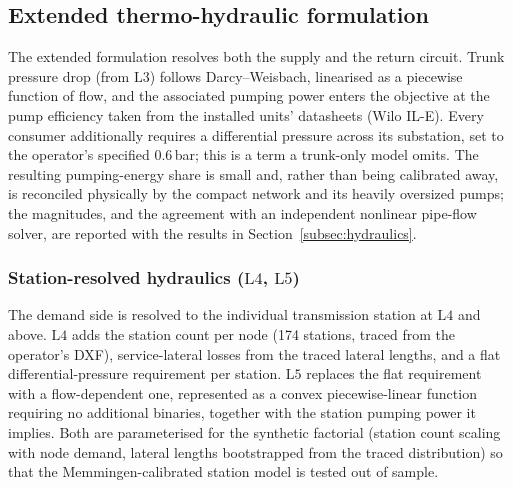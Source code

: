 \documentclass[a4paper,fleqn]{cas-sc}
\newcommand{\Lthree}{\ensuremath{\mathrm{L3}}}  %
\newcommand{\Lfour}{\ensuremath{\mathrm{L4}}}   %
\newcommand{\Lfive}{\ensuremath{\mathrm{L5}}}   %
\newcommand{\new}[1]{\textcolor[HTML]{1A5FB4}{#1}}   %
\newcommand{\new}[1]{#1}
\begin{document}
\new{}
%

\subsection{Extended thermo-hydraulic formulation}\label{sec:extended}
\new{}
The extended formulation resolves both the supply and the return circuit. Trunk pressure drop
(from $\Lthree$) follows Darcy--Weisbach, linearised as a piecewise function of flow, and the
associated pumping power enters the objective at the pump efficiency taken from the installed
units' datasheets (Wilo IL-E). Every consumer additionally requires a differential pressure
across its substation, set to the operator's specified $0.6$\,bar; this is a term a
trunk-only model omits. The resulting pumping-energy share is small and, rather than being
calibrated away, is reconciled physically by the compact network and its heavily oversized pumps;
the magnitudes, and the agreement with an independent nonlinear pipe-flow solver, are reported
with the results in Section~\ref{subsec:hydraulics}.

\subsubsection{Station-resolved hydraulics ($\Lfour$, $\Lfive$)}
\label{subsec:stationhyd}
The demand side is resolved to the individual transmission station at $\Lfour$ and above.
$\Lfour$ adds the station count per node (174 stations, traced from the operator's DXF),
service-lateral losses from the traced lateral lengths, and a flat differential-pressure
requirement per station. $\Lfive$ replaces the flat requirement with a flow-dependent one,
represented as a convex piecewise-linear function requiring no additional binaries, together
with the station pumping power it implies. Both are parameterised for the synthetic factorial
(station count scaling with node demand, lateral lengths bootstrapped from the traced
distribution) so that the Memmingen-calibrated station model is tested out of sample.
\end{document}
